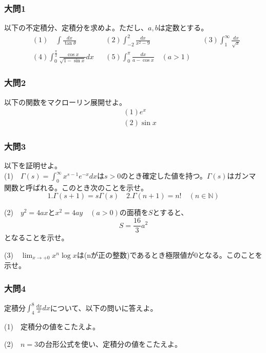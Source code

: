 \documentclass[a4j,dvipdfmx]{jsarticle}
\begin{document}
    \subsubsection*{大問1}
    以下の不定積分、定積分を求めよ。ただし、$a,b$は定数とする。
    \begin{align*}
        &(1)\quad\int \frac{dx}{\tan\theta}&&(2) \int_{-2}^{2}\frac{dx}{x^2-9}&&(3) \int_1^{\infty}\frac{dx}{\sqrt{x}}\\
        &(4)\int_{0}^{\frac{\pi}{2}}\frac{\cos x}{\sqrt{1-\sin x}}dx&&(5) \int_0^{\pi} \frac{dx}{a-\cos x}\quad(a>1)
    \end{align*}
    \subsubsection*{大問2}
    以下の関数をマクローリン展開せよ。
    \begin{align*}
        &\quad (1)e^x\\
        &\quad (2)\sin x
    \end{align*}
    \subsubsection*{大問3}
    以下を証明せよ。\\
    
    (1)　$\displaystyle \Gamma(s)=\int_0^{\infty}x^{s-1}e^{-x}dx$は$s>0$のとき確定した値を持つ。$\Gamma(s)$はガンマ関数と呼ばれる。このとき次のことを示せ。
    \begin{equation*}
        1.\Gamma(s+1)=s\Gamma(s)\quad2.\Gamma(n+1)=n!\quad(n\in\mathbb{N} )
    \end{equation*}

    (2)　$\displaystyle y^2=4ax\text{と}x^2=4ay\quad(a>0)$の面積を$S$とすると、
    \begin{equation*}
        S=\frac{16}{3}a^2
    \end{equation*}
    となることを示せ。

    (3)　$\displaystyle \lim_{x\to+0}x^n\log x$は(nが正の整数)であるとき極限値が0となる。このことを示せ。
    \subsubsection*{大問4}
    定積分$\displaystyle \int_4^8\frac{dx}{x}dx$について、以下の問いに答えよ。

    (1)　定積分の値をこたえよ。

    (2)　$n=3$の台形公式を使い、定積分の値をこたえよ。
\end{document}
